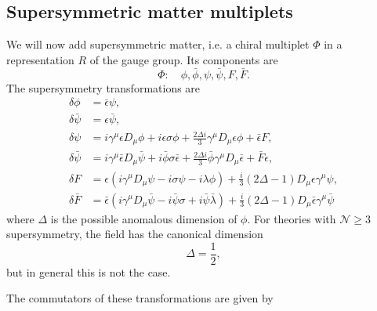 \subsection{Supersymmetric matter multiplets}
We will now add supersymmetric matter, i.e. a chiral multiplet $\Phi$ in
a representation $R$ of the gauge group. Its components are
\begin{equation}
  \Phi :\quad \phi,\bar{\phi},\psi,\bar{\psi}, F,\bar{F}.
\end{equation}
The supersymmetry transformations are
\begin{align}
  \delta\phi &= \bar{\epsilon}\psi,\nonumber\\
  \delta\bar{\psi} &= \epsilon\bar{\psi},\nonumber\\
  \delta\psi &= i\gamma^\mu\epsilon D_\mu\phi + i\epsilon\sigma\phi
  + \frac{2\Delta i}{3}\gamma^\mu D_\mu\epsilon\phi
  + \bar{\epsilon}F,\nonumber\\
  \delta{\bar{\psi}} &= i\gamma^\mu\bar{\epsilon} D_\mu \bar{\psi}
  + i\bar{\phi}\sigma\bar{\epsilon} + \frac{2\Delta i}{3}\bar{\phi}\gamma^\mu
  D_\mu\bar{\epsilon} + \bar{F}\epsilon,\nonumber\\
  \delta F &= \epsilon(i\gamma^\mu D_\mu \psi - i\sigma\psi - i\lambda\phi)
  + \frac{i}{3}(2\Delta - 1)D_\mu\epsilon\gamma^\mu\psi,\nonumber\\
  \delta\bar{F} &= \bar{\epsilon}(i\gamma^\mu D_\mu \bar{\psi}
  - i\bar{\psi}\sigma + i\bar{\psi}\bar{\lambda}) + \frac{i}{3}(2\Delta
  -1)D_\mu\bar{\epsilon}\gamma^\mu\bar{\psi}
\end{align}
where $\Delta$ is the possible anomalous dimension of $\phi$. For theories
with $\mathcal{N}\geq 3$ supersymmetry, the field has the canonical dimension
\begin{equation}
  \Delta = \frac{1}{2},
\end{equation}
but in general this is not the case.
\par The commutators of these transformations are given by
